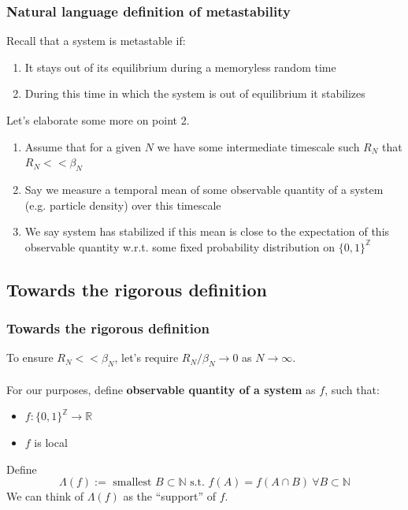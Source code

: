 \documentclass{beamer}
\begin{document}
\begin{frame}
    \frametitle{Natural language definition of metastability}

    Recall that a system is metastable if:
    \begin{enumerate}
        \item It stays out of its equilibrium during a memoryless random time
        \item During this time in which the system is out of equilibrium it stabilizes
    \end{enumerate}
    Let's elaborate some more on point 2.
    \begin{enumerate}
        \item Assume that for a given $N$ we have some intermediate timescale such $R_N$ that $R_N << \beta_N$
        \item Say we measure a temporal mean of some observable quantity of a system (e.g. particle density) over this timescale
        \item We say system has stabilized if this mean is close to the expectation of this observable quantity w.r.t. some fixed probability distribution on $\{0,1\}^{\mathbb{Z}}$
    \end{enumerate}
\end{frame}

\subsection{Towards the rigorous definition} %

\begin{frame}
    \frametitle{Towards the rigorous definition}
    To ensure $R_N << \beta_N$, let's require $R_N / \beta_N \rightarrow 0$ as $N \rightarrow \infty$.
    \\~\\ 
    For our purposes, define \textbf{observable quantity of a system} as $f$, such that:
    \begin{itemize}
        \item $f : \{0,1\}^{\mathbb{Z}} \rightarrow \mathbb{R}$
        \item $f$ is local
    \end{itemize}
    Define 
    \[
        \Lambda(f) :=  \text{ smallest } B\subset \mathbb{N} \text{ s.t. } f(A) = f(A\cap B) \ \forall B \subset \mathbb{N}
    \]
    We can think of $\Lambda(f)$ as the ``support'' of $f$.
\end{frame}
\end{document}
